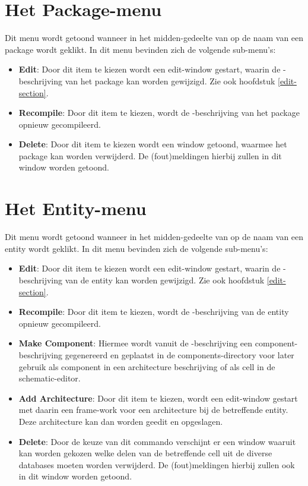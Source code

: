 \section{Het Package-menu}
Dit menu wordt getoond wanneer in het midden-gedeelte van 
op de naam van een package wordt geklikt.
In dit menu bevinden zich de volgende sub-menu's:
\begin{itemize}
\item {\bf Edit}: Door dit item te kiezen wordt een edit-window gestart, waarin de
             -beschrijving van het package kan worden gewijzigd.
Zie ook hoofdstuk \ref{edit-section}.
\item {\bf Recompile}: Door dit item te kiezen, wordt de -beschrijving van
                  het package opnieuw gecompileerd.
\item {\bf Delete}: Door dit item te kiezen wordt een window getoond, waarmee het
             package kan worden verwijderd. De (fout)meldingen hierbij zullen
             in dit window worden getoond.
\end{itemize}

\section{Het Entity-menu}
Dit menu wordt getoond wanneer in het midden-gedeelte van 
op de naam van een entity wordt geklikt.
In dit menu bevinden zich de volgende sub-menu's:
\begin{itemize}
\item {\bf Edit}: Door dit item te kiezen wordt een edit-window gestart, waarin de
             -beschrijving van de entity kan worden gewijzigd.
Zie ook hoofdstuk \ref{edit-section}.
\item {\bf Recompile}: Door dit item te kiezen, wordt de -beschrijving van
                  de  entity opnieuw gecompileerd.
\item {\bf Make Component}: Hiermee wordt vanuit de -beschrijving
                     een component-beschrijving gegenereerd en geplaatst in de
                     components-directory voor later gebruik als component
                     in een architecture beschrijving of als cell in de
                     schematic-editor.
\item {\bf Add Architecture}: Door dit item te kiezen, wordt een edit-window
                         gestart met daarin een frame-work voor een
                         architecture bij de betreffende entity. Deze
                         architecture kan dan worden geedit en opgeslagen.
\item {\bf Delete}: Door de keuze van dit commando verschijnt er een window
                waaruit kan worden gekozen welke delen van de betreffende
                cell uit de diverse databases moeten worden verwij\-derd.
                De (fout)meldingen hierbij zullen ook in dit window worden
                getoond.
\end{itemize}

